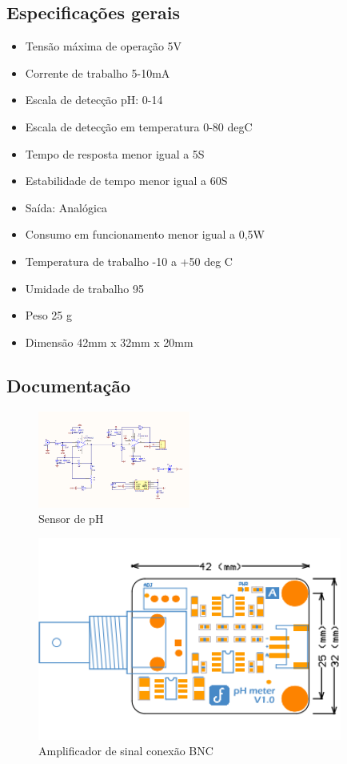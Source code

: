 \subsection{Especificações gerais}

\begin{itemize}
	\item Tensão máxima de operação 5V
	\item Corrente de trabalho 5-10mA
	\item Escala de detecção pH: 0-14
	\item Escala de detecção em temperatura 0-80 degC
	\item Tempo de resposta menor igual a 5S
	\item Estabilidade de tempo menor igual a 60S
	\item Saída: Analógica
	\item Consumo em funcionamento menor igual a 0,5W
	\item Temperatura de trabalho -10 a +50 deg C
	\item Umidade de trabalho 95 %
	\item Peso 25 g
	\item Dimensão 42mm x 32mm x 20mm
\end{itemize}

\subsection{Documentação}

\begin{figure}[H]
	\centering
	\includegraphics[width=5cm]{figuras/sensor_ph.png}
	\caption{Sensor de pH}
	\label{sensor_ph}
\end{figure}

\begin{figure}[H]
	\centering
	\includegraphics[width=10cm]{figuras/amplificador.png}
	\caption{Amplificador de sinal conexão BNC}
	\label{amplificador}
\end{figure}

